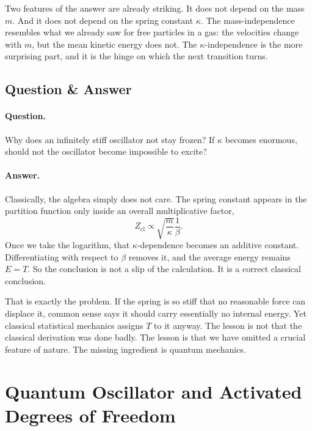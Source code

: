 Two features of the answer are already striking. It does not depend on the mass \(m\). And it does not depend on the spring constant \(\kappa\). The mass-independence resembles what we already saw for free particles in a gas: the velocities change with \(m\), but the mean kinetic energy does not. The \(\kappa\)-independence is the more surprising part, and it is the hinge on which the next transition turns.

\subsection{Question \& Answer}

\paragraph{Question.} Why does an infinitely stiff oscillator not stay frozen? If \(\kappa\) becomes enormous, should not the oscillator become impossible to excite?

\paragraph{Answer.} Classically, the algebra simply does not care. The spring constant appears in the partition function only inside an overall multiplicative factor,
\begin{equation}
Z_{\mathrm{cl}}\propto \sqrt{\frac{m}{\kappa}}\frac{1}{\beta}.
\end{equation}
Once we take the logarithm, that \(\kappa\)-dependence becomes an additive constant. Differentiating with respect to \(\beta\) removes it, and the average energy remains \(E=T\). So the conclusion is not a slip of the calculation. It is a correct classical conclusion.

That is exactly the problem. If the spring is so stiff that no reasonable force can displace it, common sense says it should carry essentially no internal energy. Yet classical statistical mechanics assigns \(T\) to it anyway. The lesson is not that the classical derivation was done badly. The lesson is that we have omitted a crucial feature of nature. The missing ingredient is quantum mechanics.

\section{Quantum Oscillator and Activated Degrees of Freedom}

